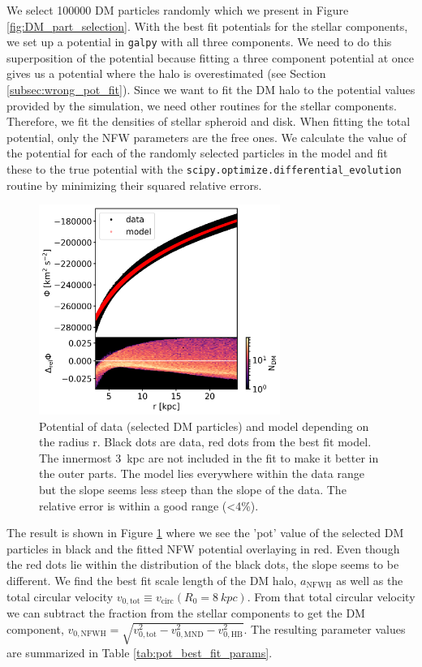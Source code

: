 We select 100000 \ac{DM} particles randomly which we present in Figure \ref{fig:DM_part_selection}. With the best fit potentials for the stellar components, we set up a potential in \texttt{galpy} with all three components. We need to do this superposition of the potential because fitting a three component potential at once gives us a potential where the halo is overestimated (see Section \ref{subsec:wrong_pot_fit}). Since we want to fit the \ac{DM} halo to the potential values provided by the simulation, we need other routines for the stellar components. Therefore, we fit the densities of stellar spheroid and disk. When fitting the total potential, only the \ac{NFW} parameters are the free ones. We calculate the value of the potential for each of the randomly selected particles in the model and fit these to the true potential with the \texttt{scipy.optimize.differential\_evolution} routine by minimizing their squared relative errors.
\begin{figure}
\captionsetup{format=plain}
    \centering
    \includegraphics[width=0.7\textwidth]{plots/Auriga/phi_model_and_data_snap_with_rel_error_127.png}
    \caption{Potential of data (selected \ac{DM} particles) and model depending on the radius r. Black dots are data, red dots from the best fit model. The innermost \SI{3}{kpc} are not included in the fit to make it better in the outer parts. The model lies everywhere within the data range but the slope seems less steep than the slope of the data. The relative error is within a good range (<4\%).}
    \label{fig:potential_best_fit}
\end{figure}
The result is shown in Figure \ref{fig:potential_best_fit} where we see the 'pot' value of the selected \ac{DM} particles in black and the fitted \ac{NFW} potential overlaying in red. Even though the red dots lie within the distribution of the black dots, the slope seems to be different. We find the best fit scale length of the \ac{DM} halo, $a_{\mathrm{NFWH}}$ as well as the total circular velocity $v_{0,\mathrm{tot}} \equiv v_{\mathrm{circ}}(R_0 = \SI{8}{kpc}) $. From that total circular velocity we can subtract the fraction from the stellar components to get the \ac{DM} component, $v_{0,\mathrm{NFWH}} = \sqrt{v_{0,\mathrm{tot}}^2 - v_{0, \mathrm{MND}}^2 - v_{0, \mathrm{HB}}^2}$. The resulting parameter values are summarized in Table \ref{tab:pot_best_fit_params}. 

